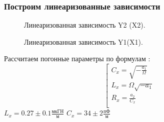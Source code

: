 \documentclass[12pt]{article}
\begin{document}
\begin{flushleft}
\subsubsection{Построим линеаризованные зависимости}
\begin{figure}[!h]
\caption{Линеаризованная зависимость Y2 (X2).}
\label{ris:image}
\end{figure}
\begin{figure}[!h]
\caption{Линеаризованная зависимость Y1(X1).}
\label{ris:image}
\end{figure}
Рассчитаем погонные параметры по формулам :
\begin{equation}
\left[
  \begin{array}{ccc}
     C_x = \sqrt{-\frac{a_1}{\Omega}} \\
     L_x = \Omega\sqrt{-a_1} \\
     R_x = \frac{a_2}{C_x} \\
  \end{array}
\right.
\end{equation}
$L_x = 0.27 \pm 0.1 \frac{\text{мкГН}}{\text{м}}$ \hspace{1cm} $C_x = 34 \pm 2 \frac{\text{пФ}}{\text{м}}$

\end{flushleft}
\end{document}
